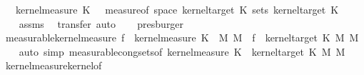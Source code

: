 \begin{isabellebody}
\ \ \ {\isachardoublequoteopen}kernel{\isacharunderscore}{\kern0pt}measure\ K\ {\isasymomega}\ {\isacharequal}{\kern0pt}\ measure{\isacharunderscore}{\kern0pt}of\ {\isacharparenleft}{\kern0pt}space\ {\isacharparenleft}{\kern0pt}kernel{\isacharunderscore}{\kern0pt}target\ K{\isacharparenright}{\kern0pt}{\isacharparenright}{\kern0pt}\ {\isacharparenleft}{\kern0pt}sets\ {\isacharparenleft}{\kern0pt}kernel{\isacharunderscore}{\kern0pt}target\ K{\isacharparenright}{\kern0pt}{\isacharparenright}{\kern0pt}\ {\isacharparenleft}{\kern0pt}{\isasymlambda}{\isacharunderscore}{\kern0pt}{\isachardot}{\kern0pt}\ {}{\isacharparenright}{\kern0pt}{\isachardoublequoteclose}\isanewline
%
\isadelimproof
\ \ %
\endisadelimproof
%
\isatagproof
{}\isamarkupfalse%
\ assms\ \isamarkupfalse%
\ {\isacharparenleft}{\kern0pt}transfer{\isacharcomma}{\kern0pt}\ auto{\isacharparenright}{\kern0pt}\isanewline
\ \ \isamarkupfalse%
\ presburger%
\endisatagproof
{\isafoldproof}%
%
\isadelimproof
\isanewline
%
\endisadelimproof
\isanewline
{}\isamarkupfalse%
\ measurable{\isacharunderscore}{\kern0pt}kernel{\isacharunderscore}{\kern0pt}measure{\isacharcolon}{\kern0pt}\ {\isachardoublequoteopen}{\isacharparenleft}{\kern0pt}f\ {\isasymin}\ {\isacharparenleft}{\kern0pt}kernel{\isacharunderscore}{\kern0pt}measure\ K\ {\isasymomega}{\isacharparenright}{\kern0pt}\ {\isasymrightarrow}\isactrlsub M\ M{\isacharparenright}{\kern0pt}\ {\isacharequal}{\kern0pt}\ {\isacharparenleft}{\kern0pt}f\ {\isasymin}\ {\isacharparenleft}{\kern0pt}kernel{\isacharunderscore}{\kern0pt}target\ K{\isacharparenright}{\kern0pt}\ {\isasymrightarrow}\isactrlsub M\ M{\isacharparenright}{\kern0pt}{\isachardoublequoteclose}\isanewline
%
\isadelimproof
\ \ %
\endisadelimproof
%
\isatagproof
{}\isamarkupfalse%
\ {\isacharparenleft}{\kern0pt}auto\ simp{\isacharcolon}{\kern0pt}\ measurable{\isacharunderscore}{\kern0pt}cong{\isacharunderscore}{\kern0pt}sets{\isacharbrackleft}{\kern0pt}of\ {\isachardoublequoteopen}kernel{\isacharunderscore}{\kern0pt}measure\ K\ {\isasymomega}{\isachardoublequoteclose}\ {\isachardoublequoteopen}kernel{\isacharunderscore}{\kern0pt}target\ K{\isachardoublequoteclose}\ M\ M{\isacharbrackright}{\kern0pt}{\isacharparenright}{\kern0pt}%
\endisatagproof
{\isafoldproof}%
%
\isadelimproof
\isanewline
%
\endisadelimproof
\isanewline
{}\isamarkupfalse%
\ kernel{\isacharunderscore}{\kern0pt}measure{\isacharunderscore}{\kern0pt}kernel{\isacharunderscore}{\kern0pt}of{\isacharcolon}{\kern0pt}\isanewline

\end{isabellebody}
